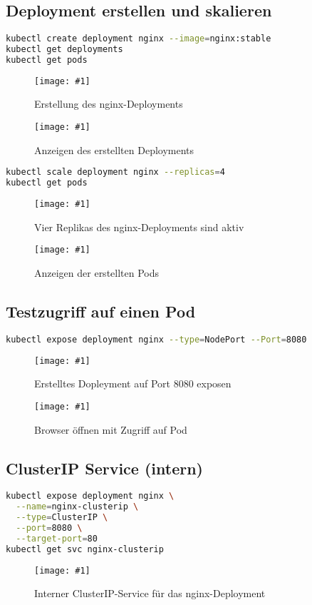 \documentclass[BMR,Seminar,ngerman,IEEE]{twbook}
\newcommand{\screenshotH}[3]{%
  \begin{figure}[H]
    \centering
    \texttt{[image: \#1]}%
    \caption{#2}%
    \label{fig:#3}%
  \end{figure}%
}
\begin{document}
\subsection{Deployment erstellen und skalieren}
\begin{lstlisting}[language=bash,caption={nginx-Deployment mit einem Pod erstellen}]
kubectl create deployment nginx --image=nginx:stable
kubectl get deployments
kubectl get pods
\end{lstlisting}
\screenshotH{minikube_create_deployment.png}{Erstellung des nginx-Deployments}{nginx-deploy}
\FloatBarrier
\screenshotH{minikube_get_deployments.png}{Anzeigen des erstellten Deployments}{get-deployments}
\FloatBarrier

\begin{lstlisting}[language=bash,caption={Deployment auf vier Replikas skalieren}]
kubectl scale deployment nginx --replicas=4
kubectl get pods
\end{lstlisting}
\screenshotH{minikube_scale_deployment.png}{Vier Replikas des nginx-Deployments sind aktiv}{scale-4replicas}
\FloatBarrier
\screenshotH{minikube_get_pods.png}{Anzeigen der erstellten Pods}{nginx-get-pods}
\FloatBarrier

\subsection{Testzugriff auf einen Pod}
\begin{lstlisting}[language=bash,caption={Port-Forwarding für lokalen Zugriff}]
kubectl expose deployment nginx --type=NodePort --Port=8080
\end{lstlisting}
\screenshotH{minikube_expose_deployment.png}{Erstelltes Dopleyment auf Port 8080 exposen}{expose-deployment}
\FloatBarrier
\screenshotH{minikube_reach_service.png}{Browser öffnen mit Zugriff auf Pod}{Reach-service}
\FloatBarrier

\subsection{ClusterIP Service (intern)}
\begin{lstlisting}[language=bash,caption={Erstellung eines internen ClusterIP-Service}]
kubectl expose deployment nginx \
  --name=nginx-clusterip \
  --type=ClusterIP \
  --port=8080 \
  --target-port=80
kubectl get svc nginx-clusterip
\end{lstlisting}
\screenshotH{minikube_expose_clusterip.png}{Interner ClusterIP-Service für das nginx-Deployment}{clusterip}
\FloatBarrier
\end{document}
